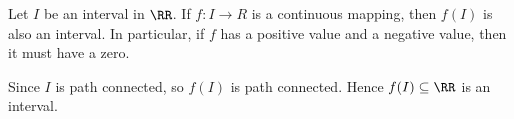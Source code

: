 \begin{corollaryenv}
    Let $I$ be an interval in $\RR$. If $f:I\longrightarrow R$ is a continuous mapping, then $f(I)$ is also an interval. In particular, if $f$ has a positive value and a negative value, then it must have a zero.
\end{corollaryenv}
\begin{proofenv}
    Since $I$ is path connected, so $f(I)$ is path connected. Hence $f(I)\subseteq \RR$ is an interval.
\end{proofenv}
